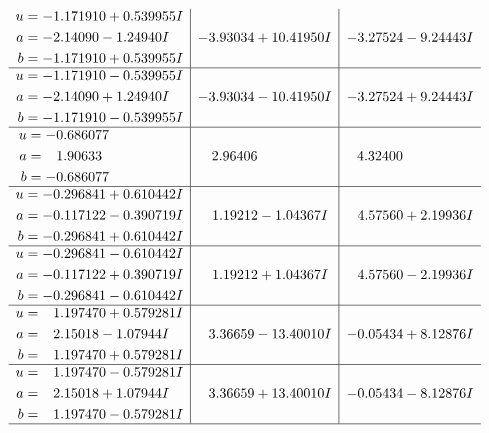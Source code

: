 \documentclass[1p]{elsarticle_modified}
\theoremstyle{definition}
\begin{document}
$$\begin{array}{c|c|c}
\begin{aligned}
u &= -1.171910 + 0.539955 I \\
a &= -2.14090 - 1.24940 I \\
b &= -1.171910 + 0.539955 I\end{aligned}
 & -3.93034 + 10.41950 I & -3.27524 - 9.24443 I \\ \hline\begin{aligned}
u &= -1.171910 - 0.539955 I \\
a &= -2.14090 + 1.24940 I \\
b &= -1.171910 - 0.539955 I\end{aligned}
 & -3.93034 - 10.41950 I & -3.27524 + 9.24443 I \\ \hline\begin{aligned}
u &= -0.686077\phantom{ +0.000000I} \\
a &= \phantom{-}1.90633\phantom{ +0.000000I} \\
b &= -0.686077\phantom{ +0.000000I}\end{aligned}
 & \phantom{-}2.96406\phantom{ +0.000000I} & \phantom{-}4.32400\phantom{ +0.000000I} \\ \hline\begin{aligned}
u &= -0.296841 + 0.610442 I \\
a &= -0.117122 - 0.390719 I \\
b &= -0.296841 + 0.610442 I\end{aligned}
 & \phantom{-}1.19212 - 1.04367 I & \phantom{-}4.57560 + 2.19936 I \\ \hline\begin{aligned}
u &= -0.296841 - 0.610442 I \\
a &= -0.117122 + 0.390719 I \\
b &= -0.296841 - 0.610442 I\end{aligned}
 & \phantom{-}1.19212 + 1.04367 I & \phantom{-}4.57560 - 2.19936 I \\ \hline\begin{aligned}
u &= \phantom{-}1.197470 + 0.579281 I \\
a &= \phantom{-}2.15018 - 1.07944 I \\
b &= \phantom{-}1.197470 + 0.579281 I\end{aligned}
 & \phantom{-}3.36659 - 13.40010 I & -0.05434 + 8.12876 I \\ \hline\begin{aligned}
u &= \phantom{-}1.197470 - 0.579281 I \\
a &= \phantom{-}2.15018 + 1.07944 I \\
b &= \phantom{-}1.197470 - 0.579281 I\end{aligned}
 & \phantom{-}3.36659 + 13.40010 I & -0.05434 - 8.12876 I\\
 \hline 
 \end{array}$$\newpage\newpage\renewcommand{\arraystretch}{1}
\end{document}
